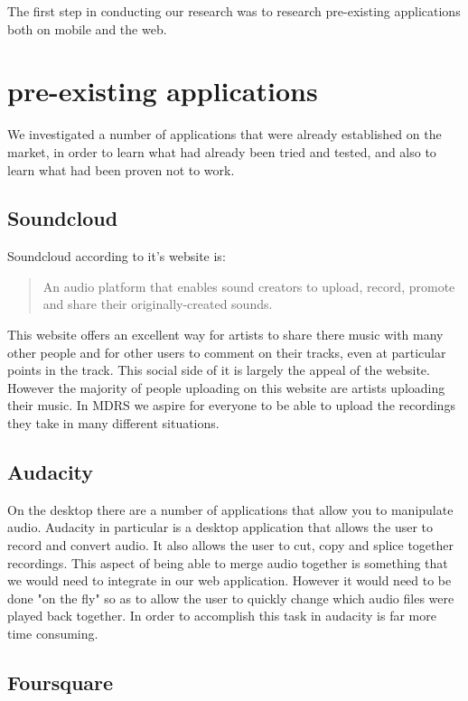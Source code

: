 \documentclass{l3proj}
\begin{document}
The first step in conducting our research was to research pre-existing applications both on mobile and the web. 

\section{pre-existing applications}

We investigated a number of applications that were already established on the market, in order to learn what had already been tried and tested, and also to learn what had been proven not to work.

\subsection{Soundcloud}

Soundcloud according to it's website is:

\blockquote{An audio platform that enables sound creators to upload, record, promote and share their originally-created sounds.}

This website offers an excellent way for artists to share there music with many other people and for other users to comment on their tracks, even at particular points in the track. This social side of it is largely the appeal of the website. However the majority of people uploading on this website are artists uploading their music. In MDRS we aspire for everyone to be able to upload the recordings they take in many different situations.

\subsection{Audacity}

On the desktop there are a number of applications that allow you to manipulate audio. Audacity in particular is a desktop application that allows the user to record and convert audio. It also allows the user to cut, copy and splice together recordings. This aspect of being able to merge audio together is something that we would need to integrate in our web application. However it would need to be done "on the fly" so as to allow the user to quickly change which audio files were played back together. In order to accomplish this task in audacity is far more time consuming.

\subsection{Foursquare}
\end{document}
